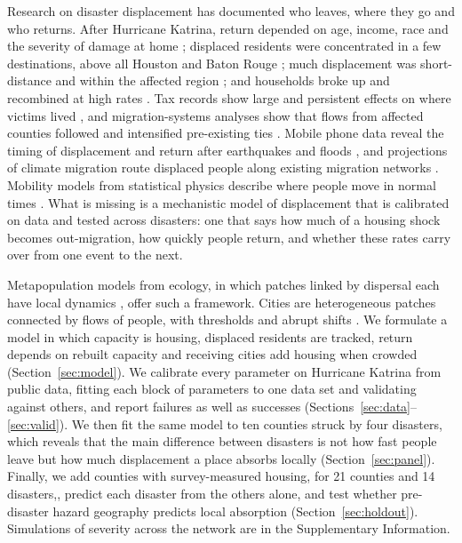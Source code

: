 \documentclass[11pt]{article}
\begin{document}
Research on disaster displacement has documented who leaves, where they go and who returns. After Hurricane Katrina, return depended on age, income, race and the severity of damage at home \citep{Fussell2010,GroenPolivka2010}; displaced residents were concentrated in a few destinations, above all Houston and Baton Rouge \citep{SastryGregory2014}; much displacement was short-distance and within the affected region \citep{Hori2009}; and households broke up and recombined at high rates \citep{Rendall2011}. Tax records show large and persistent effects on where victims lived \citep{Deryugina2018}, and migration-systems analyses show that flows from affected counties followed and intensified pre-existing ties \citep{Curtis2015,DeWaard2016}. Mobile phone data reveal the timing of displacement and return after earthquakes and floods \citep{Lu2012,Yabe2020}, and projections of climate migration route displaced people along existing migration networks \citep{Hauer2017,Robinson2020}. Mobility models from statistical physics describe where people move in normal times \citep{Simini2012}. What is missing is a mechanistic model of displacement that is calibrated on data and tested across disasters: one that says how much of a housing shock becomes out-migration, how quickly people return, and whether these rates carry over from one event to the next.

Metapopulation models from ecology, in which patches linked by dispersal each have local dynamics \citep{Levins1969,Hanski1998}, offer such a framework. Cities are heterogeneous patches connected by flows of people, with thresholds and abrupt shifts \citep{Grimm2008,Folke2016,Kache2022}. We formulate a model in which capacity is housing, displaced residents are tracked, return depends on rebuilt capacity and receiving cities add housing when crowded (Section~\ref{sec:model}). We calibrate every parameter on Hurricane Katrina from public data, fitting each block of parameters to one data set and validating against others, and report failures as well as successes (Sections~\ref{sec:data}--\ref{sec:valid}). We then fit the same model to ten counties struck by four disasters, which reveals that the main difference between disasters is not how fast people leave but how much displacement a place absorbs locally (Section~\ref{sec:panel}). Finally, we add counties with survey-measured housing, for 21 counties and 14 disasters,, predict each disaster from the others alone, and test whether pre-disaster hazard geography predicts local absorption (Section~\ref{sec:holdout}). Simulations of severity across the network are in the Supplementary Information.
\end{document}
